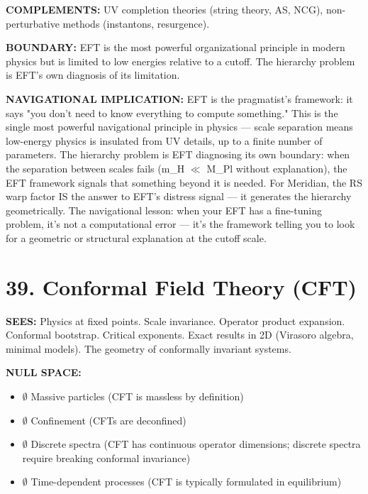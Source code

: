 \textbf{COMPLEMENTS:} UV completion theories (string theory, AS, NCG), non-perturbative methods (instantons, resurgence).


\textbf{BOUNDARY:} EFT is the most powerful organizational principle in modern physics but is limited to low energies relative to a cutoff. The hierarchy problem is EFT's own diagnosis of its limitation.


\textbf{NAVIGATIONAL IMPLICATION:} EFT is the pragmatist's framework: it says "you don't need to know everything to compute something." This is the single most powerful navigational principle in physics — scale separation means low-energy physics is insulated from UV details, up to a finite number of parameters. The hierarchy problem is EFT diagnosing its own boundary: when the separation between scales fails (m\_H $\ll$ M\_Pl without explanation), the EFT framework signals that something beyond it is needed. For Meridian, the RS warp factor IS the answer to EFT's distress signal — it generates the hierarchy geometrically. The navigational lesson: when your EFT has a fine-tuning problem, it's not a computational error — it's the framework telling you to look for a geometric or structural explanation at the cutoff scale.


\bigskip\noindent\makebox[\textwidth]{\color{rulegray}\rule{5cm}{0.3pt}}\bigskip


\section*{39. Conformal Field Theory (CFT)}


\textbf{SEES:} Physics at fixed points. Scale invariance. Operator product expansion. Conformal bootstrap. Critical exponents. Exact results in 2D (Virasoro algebra, minimal models). The geometry of conformally invariant systems.


\textbf{NULL SPACE:}

\begin{itemize}[nosep,leftmargin=*]
  \item $\emptyset$ Massive particles (CFT is massless by definition)
  \item $\emptyset$ Confinement (CFTs are deconfined)
  \item $\emptyset$ Discrete spectra (CFT has continuous operator dimensions; discrete spectra require breaking conformal invariance)
  \item $\emptyset$ Time-dependent processes (CFT is typically formulated in equilibrium)
\end{itemize}


